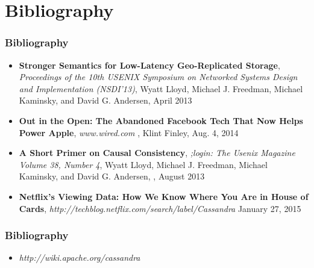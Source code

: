 \documentclass{beamer}
\begin{document}

\section{Bibliography} 

\begin{frame}
\frametitle{Bibliography}


\begin{itemize}
\item \textbf{Stronger Semantics for Low-Latency Geo-Replicated Storage}, 
\textit{Proceedings of the 10th USENIX Symposium on Networked Systems Design and Implementation (NSDI’13)}, 
Wyatt Lloyd, Michael J. Freedman, Michael Kaminsky, and David G. Andersen, 
April 2013

\item \textbf{Out in the Open: The Abandoned Facebook Tech That Now Helps Power Apple}, 
\textit{www.wired.com}
, Klint Finley, Aug. 4, 2014

\item \textbf{A Short Primer on Causal Consistency}, 
\textit{;login: The Usenix Magazine Volume 38, Number 4}, 
Wyatt Lloyd, Michael J. Freedman, Michael Kaminsky, and David G. Andersen, , August 2013

\item \textbf{Netflix's Viewing Data: How We Know Where You Are in House of Cards},
\textit{http://techblog.netflix.com/search/label/Cassandra}
January 27, 2015



\end{itemize}  
\end{frame}


\begin{frame}
\frametitle{Bibliography}

\begin{itemize}
\item \textit{http://wiki.apache.org/cassandra}

\end{itemize}  
\end{frame}
\end{document}

